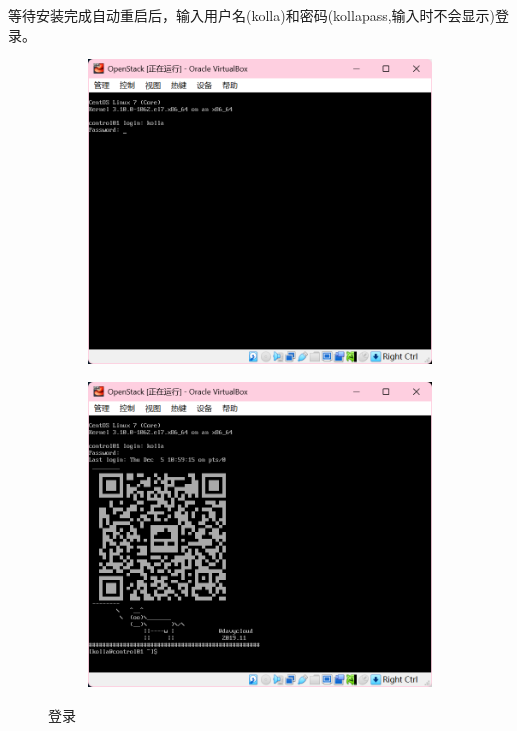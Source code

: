 \documentclass{article}
\begin{document}
等待安装完成自动重启后，输入用户名(kolla)和密码(kollapass,输入时不会显示)登录。

\begin{figure}[H]
    \centering
    \begin{subfigure}[b]{0.45\textwidth}
        \includegraphics[width=\textwidth]{img/6.3.png}
    \end{subfigure}
    \begin{subfigure}[b]{0.45\textwidth}
        \includegraphics[width=\textwidth]{img/6.4.png}
    \end{subfigure}
    \caption{登录}
\end{figure}
\end{document}
